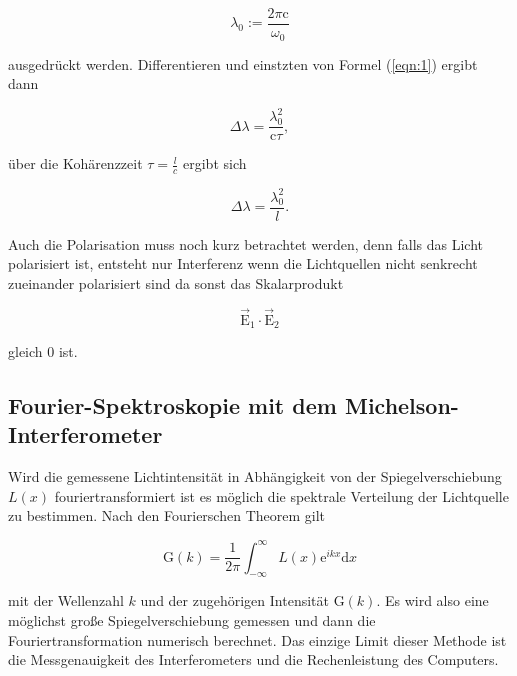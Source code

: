         \begin{equation}
            \lambda_0 := \frac{2 \pi \text{c}}{\omega_0}    \nonumber 
        \end{equation}

        \noindent ausgedrückt werden. Differentieren und einstzten von Formel (\ref{eqn:1}) ergibt dann 

        \begin{equation}
            \Delta \lambda = \frac{\lambda_0^2}{\text{c}\tau},     \nonumber 
        \end{equation}

        \noindent über die Kohärenzzeit $\tau = \frac{l}{c}$ ergibt sich 

        \begin{equation}
            \Delta \lambda = \frac{\lambda_0^2}{l}.    \nonumber 
        \end{equation}

        \noindent Auch die Polarisation muss noch kurz betrachtet werden, denn falls das Licht polarisiert ist, entsteht nur Interferenz 
        wenn die Lichtquellen nicht senkrecht zueinander polarisiert sind da sonst das Skalarprodukt 
     
        \begin{equation}
            \vec{\text{E}}_1 \cdot \vec{\text{E}}_2     \nonumber 
        \end{equation}

        \noindent gleich 0 ist.

    \subsection{Fourier-Spektroskopie mit dem Michelson-Interferometer}

            \noindent Wird die gemessene Lichtintensität in Abhängigkeit von der Spiegelverschiebung $L(x)$ fouriertransformiert ist es möglich 
            die spektrale Verteilung der Lichtquelle zu bestimmen. Nach den Fourierschen Theorem gilt 

            \begin{equation*}
                 \text{G}(k) = \frac{1}{2\pi} \int_{- \infty}^{\infty} L(x) \text{e}^{ikx} \text{d}x    \nonumber 
            \end{equation*}

            \noindent mit der Wellenzahl $k$ und der zugehörigen Intensität G$(k)$. Es wird also eine möglichst große Spiegelverschiebung gemessen 
            und dann die Fouriertransformation numerisch berechnet. Das einzige Limit dieser Methode ist die Messgenauigkeit des Interferometers und 
            die Rechenleistung des Computers.

